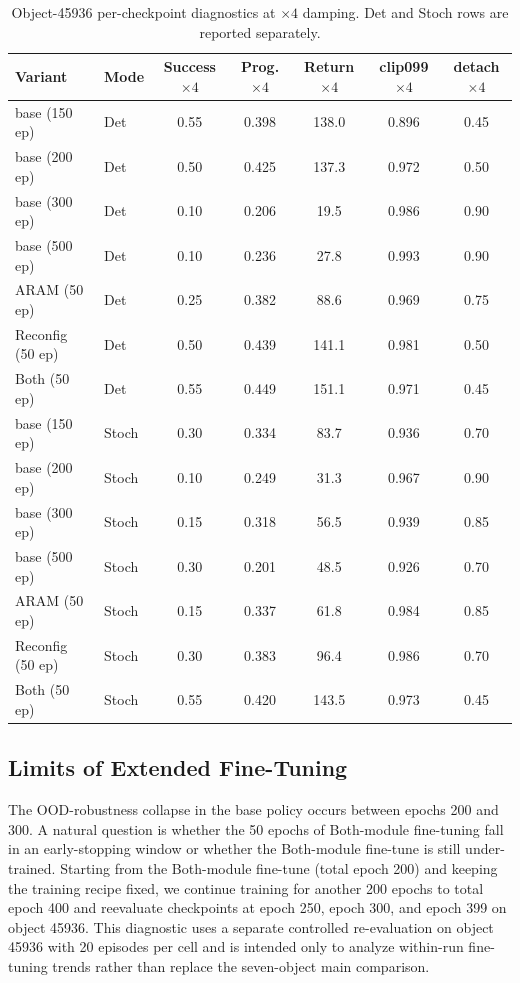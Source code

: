 \begin{table}[t]
\centering
\caption{Object-45936 per-checkpoint diagnostics at $\times4$ damping.
Det and Stoch rows are reported separately.}
\label{tab:ood}
\small
\begin{tabular}{llccccc}
\toprule
Variant & Mode & Success $\times4$ & Prog. $\times4$ & Return $\times4$
        & clip099 $\times4$ & detach $\times4$ \\
\midrule
base (150 ep)      & Det & 0.55 & 0.398 & 138.0 & 0.896 & 0.45 \\
base (200 ep)      & Det & 0.50 & 0.425 & 137.3 & 0.972 & 0.50 \\
base (300 ep)      & Det & 0.10 & 0.206 & 19.5  & 0.986 & 0.90 \\
base (500 ep)      & Det & 0.10 & 0.236 & 27.8  & 0.993 & 0.90 \\
ARAM (50 ep)      & Det & 0.25 & 0.382 & 88.6  & 0.969 & 0.75 \\
Reconfig (50 ep)  & Det & 0.50 & 0.439 & 141.1 & 0.981 & 0.50 \\
Both (50 ep)      & Det & 0.55 & 0.449 & 151.1 & 0.971 & 0.45 \\
\midrule
base (150 ep)      & Stoch & 0.30 & 0.334 & 83.7 & 0.936 & 0.70 \\
base (200 ep)      & Stoch & 0.10 & 0.249 & 31.3 & 0.967 & 0.90 \\
base (300 ep)      & Stoch & 0.15 & 0.318 & 56.5 & 0.939 & 0.85 \\
base (500 ep)      & Stoch & 0.30 & 0.201 & 48.5 & 0.926 & 0.70 \\
ARAM (50 ep)      & Stoch & 0.15 & 0.337 & 61.8 & 0.984 & 0.85 \\
Reconfig (50 ep)  & Stoch & 0.30 & 0.383 & 96.4 & 0.986 & 0.70 \\
Both (50 ep)      & Stoch & 0.55 & 0.420 & 143.5 & 0.973 & 0.45 \\
\bottomrule
\end{tabular}
\end{table}


\subsection{Limits of Extended Fine-Tuning}
\label{sec:contft}

The OOD-robustness collapse in the base policy occurs between epochs
200 and 300. A natural question is whether the 50 epochs of
Both-module fine-tuning fall in an early-stopping window or
whether the Both-module fine-tune is still under-trained. Starting from
the Both-module fine-tune (total epoch 200) and keeping the
training recipe fixed, we continue training for another 200 epochs to
total epoch 400 and reevaluate checkpoints at epoch 250,
epoch 300, and epoch 399 on object 45936. This diagnostic uses a
separate controlled re-evaluation on object 45936 with 20 episodes per
cell and is intended only to analyze within-run fine-tuning trends
rather than replace the seven-object main comparison.

